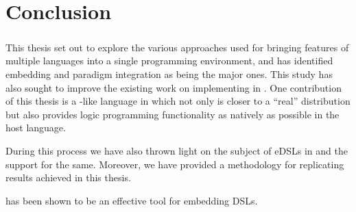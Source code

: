 \documentclass[thesis-solanki.tex]{subfiles}
\begin{document}
\chapter{Conclusion}\label{chap:conclusion}
\paragraph{}
This thesis set out to explore the various approaches used for bringing features of multiple languages into a single 
programming environment, and has identified embedding and paradigm integration as being the major ones. This study has also sought to improve
the existing work on implementing  in . One contribution of this thesis is a  
-like language in  which not only is closer to a ``real''  distribution but also provides 
logic programming functionality as natively as possible in the host language.

During this process we have also thrown light on the subject of eDSLs in  and the support for the same. Moreover, we
have provided a methodology for replicating results achieved in this thesis.

 has been shown to be an effective tool for embedding DSLs.


\ifMain
\begin{scope}
  \nolinenumbers
  \enotesize
  \par
  \begin{singlespace}
  \setlength{\parskip}{12pt plus 2pt minus 1pt}
  \theendnotes
  \par
  \end{singlespace}
\end{scope}
\fi
\end{document}
